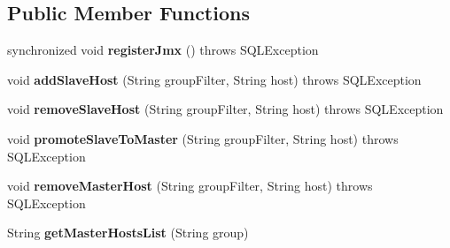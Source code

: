 \subsection*{Public Member Functions}
\begin{DoxyCompactItemize}
\item 
\mbox{\label{classcom_1_1mysql_1_1jdbc_1_1jmx_1_1_replication_group_manager_a5721999b0d1a3bffe94ab0cbb452758f}} 
synchronized void {\bfseries register\+Jmx} ()  throws S\+Q\+L\+Exception 
\item 
\mbox{\label{classcom_1_1mysql_1_1jdbc_1_1jmx_1_1_replication_group_manager_a102d9db3d6e802615e6f4914bdc96ac1}} 
void {\bfseries add\+Slave\+Host} (String group\+Filter, String host)  throws S\+Q\+L\+Exception 
\item 
\mbox{\label{classcom_1_1mysql_1_1jdbc_1_1jmx_1_1_replication_group_manager_abe8be1ea6deb9b726fff62b5e2d90c65}} 
void {\bfseries remove\+Slave\+Host} (String group\+Filter, String host)  throws S\+Q\+L\+Exception 
\item 
\mbox{\label{classcom_1_1mysql_1_1jdbc_1_1jmx_1_1_replication_group_manager_a65746ef5e4f1e47598d4c4b7cca509d5}} 
void {\bfseries promote\+Slave\+To\+Master} (String group\+Filter, String host)  throws S\+Q\+L\+Exception 
\item 
\mbox{\label{classcom_1_1mysql_1_1jdbc_1_1jmx_1_1_replication_group_manager_a44b4999501ef6d58a4d0bdb301d9ee07}} 
void {\bfseries remove\+Master\+Host} (String group\+Filter, String host)  throws S\+Q\+L\+Exception 
\item 
\mbox{\label{classcom_1_1mysql_1_1jdbc_1_1jmx_1_1_replication_group_manager_aa8a09c047e9c41393437c5704c40149f}} 
String {\bfseries get\+Master\+Hosts\+List} (String group)
\item 
\mbox{\label{classcom_1_1mysql_1_1jdbc_1_1jmx_1_1_replication_group_manager_af610a7decf7ebb76ce1b332794de2081}} 

\end{DoxyCompactItemize}
